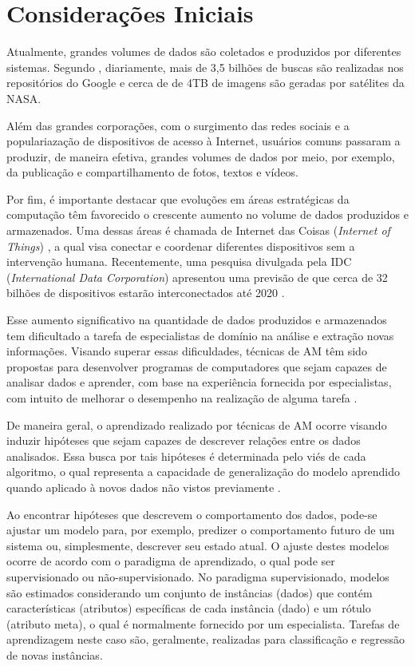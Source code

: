 \label{introducao}

\section{Considerações Iniciais}

Atualmente, grandes volumes de dados são coletados e produzidos por diferentes sistemas. Segundo , diariamente, mais de 3,5 bilhões de buscas são realizadas nos repositórios do Google e cerca de de 4TB de imagens são geradas por satélites da NASA. 

Além das grandes corporações, com o surgimento das redes sociais e a populariazação de dispositivos de acesso à Internet, usuários comuns passaram a produzir, de maneira efetiva, grandes volumes de dados por meio, por exemplo, da publicação e compartilhamento de fotos, textos e vídeos.

Por fim, é importante destacar que evoluções em áreas estratégicas da computação têm favorecido o crescente aumento no volume de dados produzidos e armazenados. Uma dessas áreas é chamada de Internet das Coisas  (\textit{Internet of Things}) \cite{iot}, a qual visa conectar e coordenar diferentes dispositivos sem a intervenção humana. Recentemente, uma pesquisa divulgada pela IDC (\textit{International Data Corporation})  apresentou uma previsão de que cerca de 32 bilhões de dispositivos estarão interconectados até 2020 \cite{iot}. 

Esse aumento significativo na quantidade de dados produzidos e armazenados tem dificultado a tarefa de especialistas de domínio na análise e extração novas informações. Visando superar essas dificuldades, técnicas de \ac{AM} têm sido propostas para desenvolver programas de computadores que sejam capazes de analisar dados e aprender, com base na experiência fornecida por especialistas, com intuito de melhorar o desempenho na realização de alguma tarefa \cite{Mitchell:1997:ML:541177,faceli2011inteligencia}. 

De maneira geral, o aprendizado realizado por técnicas de \ac{AM} ocorre visando induzir hipóteses que sejam capazes de descrever relações entre os dados analisados. Essa busca por tais hipóteses é determinada pelo viés de cada algoritmo, o qual representa a capacidade de generalização do modelo aprendido quando aplicado à novos dados não vistos previamente \cite{faceli2011inteligencia}.

Ao encontrar hipóteses que descrevem o comportamento dos dados, pode-se ajustar um modelo para, por exemplo, predizer o comportamento futuro de um sistema ou, simplesmente, descrever seu estado atual. O ajuste destes modelos ocorre de acordo com o paradigma de aprendizado, o qual pode ser supervisionado ou não-supervisionado. No paradigma supervisionado, modelos são estimados considerando um conjunto de instâncias (dados) que contém características (atributos) específicas de cada instância (dado) e um rótulo (atributo meta), o qual é normalmente fornecido por um especialista. Tarefas de aprendizagem neste caso são, geralmente, realizadas para classificação e regressão de novas instâncias.

